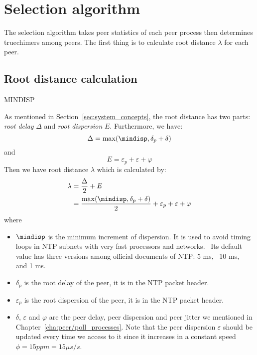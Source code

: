 \section{Selection algorithm}%
\label{sec:selection_algorithm}
The selection algorithm takes peer statistics of each peer process then
determines truechimers among peers. The first thing is to calculate root
distance $\lambda$ for each peer.

\subsection{Root distance calculation}%
\label{sub:root_distance_calculation}

\begin{myverbbox}
    {\mindisp}MINDISP
\end{myverbbox}

As mentioned in Section~\ref{sec:system_concepts}, the root distance has two
parts: \emph{root delay} $\Delta$ and \emph{root dispersion} $E$. Furthermore, 
we have: 
\begin{equation}
    \Delta = \max(\mindisp, \delta_p + \delta)
    \label{eq:root_delay}
\end{equation}
and
\begin{equation}
    E = \varepsilon_p + \varepsilon + \varphi
    \label{eq:root_dispersion}
\end{equation}
Then we have root distance $\lambda$ which is calculated by:
\begin{align}
    \lambda & = \frac{\Delta}{2} + E\\
    & =\frac{\max(\mindisp, \delta_p + \delta)}{2} 
    + \varepsilon_p + \varepsilon + \varphi
    \label{eq:root_distance}
\end{align}
where 
\begin{itemize}
    \item $\mindisp$ is the minimum increment of dispersion.  It is used to
        avoid timing loops in NTP subnets with very fast processors and
        networks.~\cite{rfc5905} Its default value has three versions among
        official documents of NTP: 5 ms,~\cite{rfc5905} 10 ms,~\cite{rfc5905}
        and 1 ms.~\cite{performance_metrics}
    \item $\delta_p$ is the root delay of the peer, it is in the NTP packet
        header.
    \item $\varepsilon_p$ is the root dispersion of the peer, it is in the NTP
        packet header.
    \item $\delta$, $\varepsilon$ and $\varphi$  are the peer delay, peer
        dispersion and peer jitter we mentioned in
        Chapter~\ref{cha:peer/poll_processes}. Note that the peer dispersion
        $\varepsilon$ should be updated every time we access to it since it
        increases in a constant speed $\phi = 15 ppm = 15 \mu s/s$.
\end{itemize}

